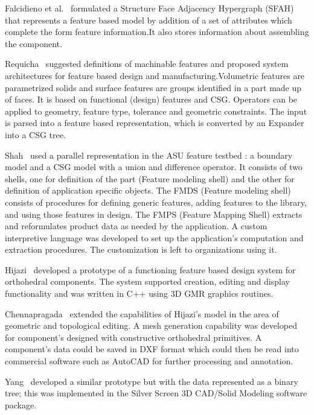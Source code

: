 		Falcidieno et al.~\cite{Falc} formulated a Structure Face Adjacency 
		Hypergraph (SFAH) that represents a feature based model by 
		addition of a set of attributes which complete the form feature 
		information.It also stores information about assembling the 
		component.
 

        Requicha~\cite{Requi89} suggested definitions of machinable features
		and proposed system architectures for feature based design and 
		manufacturing.Volumetric features are parametrized solids and 
		surface features are groups identified in a part made up of faces. 
		It is based on functional (design) features and CSG. 
		Operators can be applied to
		geometry, feature type, tolerance and geometric constraints. 
		The input is parsed into a feature based representation, which is 
		converted by an Expander into a CSG tree.
 

        Shah~\cite{ShahMa} used a parallel representation in the ASU feature 
		testbed : 
		a boundary model and a CSG model with a union and difference operator. 
		It consists of two shells, one for definition of the part (Feature 
		modeling shell) and the other for definition of application specific 
		objects. The FMDS (Feature modeling shell) consists of procedures for 
		defining generic features, adding features to the library, and using 
		those features in design. The FMPS (Feature Mapping Shell) extracts 
		and 
		reformulates product data as needed by the application. A custom 
		interpretive language was developed to set up the application's 
		computation and extraction procedures.
		The customization is left to organizations using it.
 

        Hijazi~\cite{Hijazi} developed a prototype of a functioning feature
 		based design system for orthohedral components. The system supported 
		creation, editing and display functionality and was written in 
		C++ using 3D GMR graphics routines.

 
        Chennapragada~\cite{Venky} extended the capabilities of Hijazi's 
		model in the area of geometric and topological editing. A mesh 
		generation capability was developed for component's designed with 
		constructive orthohedral 
		primitives. A component's data could be saved in DXF format which could
		then be read into commercial software such as AutoCAD for further 
		processing and annotation.

 
		Yang~\cite{Yang} developed a similar prototype but with the data
		represented as a binary tree; this was implemented in the Silver Screen
		3D CAD/Solid Modeling software package.


